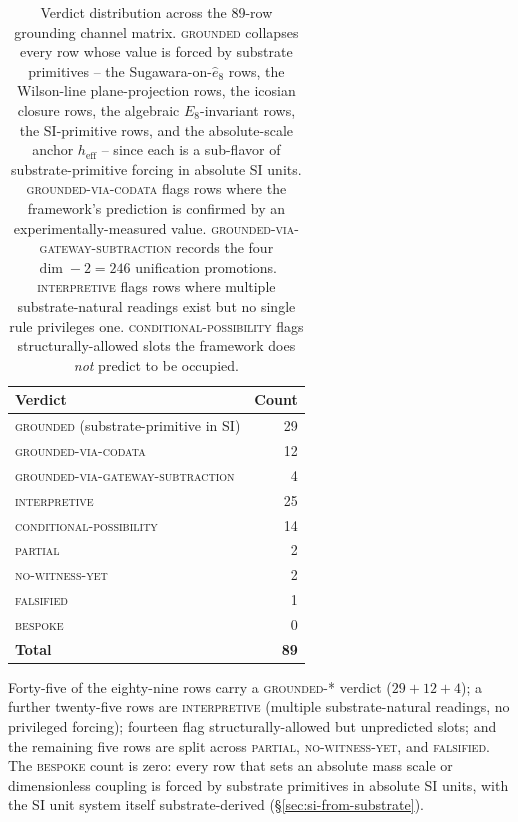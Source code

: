 ﻿\documentclass[reprint,amsmath,amssymb,aps,prd,longbibliography,floatfix]{revtex4-2}
\begin{document}
\begin{table}[h]
\centering
\caption{Verdict distribution across the 89-row grounding channel
matrix. \textsc{grounded} collapses every row whose value is forced by
substrate primitives -- the Sugawara-on-$\widehat{e}_8$ rows, the
Wilson-line plane-projection rows, the icosian closure rows, the
algebraic $E_8$-invariant rows, the SI-primitive rows, and the
absolute-scale anchor $h_\mathrm{eff}$ -- since each is a sub-flavor
of substrate-primitive forcing in absolute SI units.
\textsc{grounded-via-codata} flags rows where the framework's
prediction is confirmed by an experimentally-measured value.
\textsc{grounded-via-gateway-subtraction} records the four
$\dim - 2 = 246$ unification promotions. \textsc{interpretive} flags
rows where multiple substrate-natural readings exist but no single rule
privileges one. \textsc{conditional-possibility} flags
structurally-allowed slots the framework does \emph{not} predict to be
occupied.}
\label{tab:v4-verdict-counts}
\begin{tabular}{lr}
\toprule
Verdict & Count \\
\midrule
\textsc{grounded} (substrate-primitive in SI)            & 29 \\
\textsc{grounded-via-codata}                              & 12 \\
\textsc{grounded-via-gateway-subtraction}                 &  4 \\
\textsc{interpretive}                                     & 25 \\
\textsc{conditional-possibility}                          & 14 \\
\textsc{partial}                                          &  2 \\
\textsc{no-witness-yet}                                   &  2 \\
\textsc{falsified}                                        &  1 \\
\textsc{bespoke}                                          &  0 \\
\midrule
\textbf{Total}                                            & \textbf{89} \\
\bottomrule
\end{tabular}
\end{table}

Forty-five of the eighty-nine rows carry a \textsc{grounded-*} verdict
($29 + 12 + 4$); a further twenty-five rows are \textsc{interpretive}
(multiple substrate-natural readings, no privileged forcing); fourteen
flag structurally-allowed but unpredicted slots; and the remaining five
rows are split across \textsc{partial}, \textsc{no-witness-yet}, and
\textsc{falsified}. The \textsc{bespoke} count is zero: every row that
sets an absolute mass scale or dimensionless coupling is forced by
substrate primitives in absolute SI units, with the SI unit system
itself substrate-derived (\S\ref{sec:si-from-substrate}).
\end{document}

